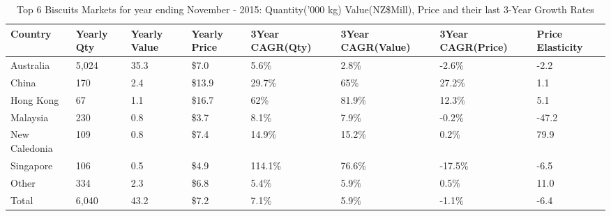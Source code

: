 \begin{table}[ht]
\centering
{\scriptsize
\begin{tabular}[t]{p{1.8cm}>{\hfill}p{1.4cm}>{\hfill}p{1.4cm}>{\hfill}p{1.6cm}>{\hfill}p{1.9cm}>{\hfill}p{2cm}>{\hfill}p{1.9cm}>{\hfill}p{1.5cm}}
 \textbf{Country} & \textbf{Yearly Qty} & \textbf{Yearly Value} & \textbf{Yearly Price} & \textbf{3Year CAGR(Qty)} & \textbf{3Year CAGR(Value)} & \textbf{3Year CAGR(Price)} & \textbf{Price Elasticity} \\
\hline
Australia & 5,024 & 35.3 & \$7.0 & 5.6\% & 2.8\% & -2.6\% & -2.2 \\  
China & 170 & 2.4 & \$13.9 & 29.7\% & 65\% & 27.2\% & 1.1 \\  
Hong Kong & 67 & 1.1 & \$16.7 & 62\% & 81.9\% & 12.3\% & 5.1 \\  
Malaysia & 230 & 0.8 & \$3.7 & 8.1\% & 7.9\% & -0.2\% & -47.2 \\  
New Caledonia & 109 & 0.8 & \$7.4 & 14.9\% & 15.2\% & 0.2\% & 79.9 \\  
Singapore & 106 & 0.5 & \$4.9 & 114.1\% & 76.6\% & -17.5\% & -6.5 \\  
Other & 334 & 2.3 & \$6.8 & 5.4\% & 5.9\% & 0.5\% & 11.0 \\  
Total & 6,040 & 43.2 & \$7.2 & 7.1\% & 5.9\% & -1.1\% & -6.4 \\  
\hline
\end{tabular}
}
\caption{\scriptsize Top 6 Biscuits Markets for year ending November - 2015: Quantity('000 kg) Value(NZ\$Mill), Price and their last 3-Year Growth Rates}
\end{table}

